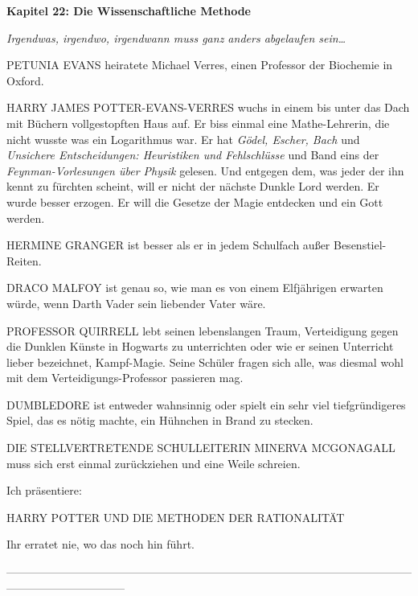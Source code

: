 

\hypertarget{die-wissenschaftliche-methode}{%

\textbf{Kapitel 22: Die Wissenschaftliche Methode\\ }

\emph{Irgendwas, irgendwo, irgendwann muss ganz anders abgelaufen sein…}

PETUNIA EVANS heiratete Michael Verres, einen Professor der Biochemie in Oxford.

HARRY JAMES POTTER-EVANS-VERRES wuchs in einem bis unter das Dach mit Büchern vollgestopften Haus auf. Er biss einmal eine Mathe-Lehrerin, die nicht wusste was ein Logarithmus war. Er hat \emph{Gödel, Escher, Bach} und \emph{Unsichere Entscheidungen: Heuristiken und Fehlschlüsse} und Band eins der \emph{Feynman-Vorlesungen über Physik} gelesen. Und entgegen dem, was jeder der ihn kennt zu fürchten scheint, will er nicht der nächste Dunkle Lord werden. Er wurde besser erzogen. Er will die Gesetze der Magie entdecken und ein Gott werden.

HERMINE GRANGER ist besser als er in jedem Schulfach außer Besenstiel-Reiten.

DRACO MALFOY ist genau so, wie man es von einem Elfjährigen erwarten würde, wenn Darth Vader sein liebender Vater wäre.

PROFESSOR QUIRRELL lebt seinen lebenslangen Traum, Verteidigung gegen die Dunklen Künste in Hogwarts zu unterrichten oder wie er seinen Unterricht lieber bezeichnet, Kampf-Magie. Seine Schüler fragen sich alle, was diesmal wohl mit dem Verteidigungs-Professor passieren mag.

DUMBLEDORE ist entweder wahnsinnig oder spielt ein sehr viel tiefgründigeres Spiel, das es nötig machte, ein Hühnchen in Brand zu stecken.

DIE STELLVERTRETENDE SCHULLEITERIN MINERVA MCGONAGALL muss sich erst einmal zurückziehen und eine Weile schreien.

Ich präsentiere:

HARRY POTTER UND DIE METHODEN DER RATIONALITÄT

Ihr erratet nie, wo das noch hin führt.

--------------------------------------------------------------------------------------------------------------------------------------------

}

